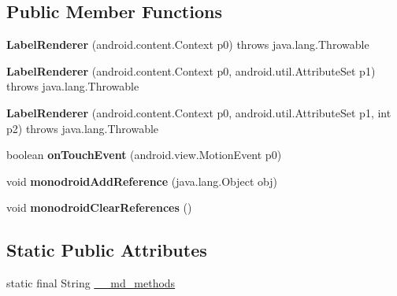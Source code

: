\subsection*{Public Member Functions}
\begin{DoxyCompactItemize}
\item 
\mbox{\label{classmd57018357d52b54713cd814fbd5262dd1f_1_1LabelRenderer_aaebdd1a385896c15116f4f28a7b14918}} 
{\bfseries Label\+Renderer} (android.\+content.\+Context p0)  throws java.\+lang.\+Throwable 	
\item 
\mbox{\label{classmd57018357d52b54713cd814fbd5262dd1f_1_1LabelRenderer_adaa775bc61d4d4d62b052709e7420a74}} 
{\bfseries Label\+Renderer} (android.\+content.\+Context p0, android.\+util.\+Attribute\+Set p1)  throws java.\+lang.\+Throwable 	
\item 
\mbox{\label{classmd57018357d52b54713cd814fbd5262dd1f_1_1LabelRenderer_aca7fb08e1f26103c255dfaa50e9f0a16}} 
{\bfseries Label\+Renderer} (android.\+content.\+Context p0, android.\+util.\+Attribute\+Set p1, int p2)  throws java.\+lang.\+Throwable 	
\item 
\mbox{\label{classmd57018357d52b54713cd814fbd5262dd1f_1_1LabelRenderer_a29e4f37b703ed211f7df60679839d2bf}} 
boolean {\bfseries on\+Touch\+Event} (android.\+view.\+Motion\+Event p0)
\item 
\mbox{\label{classmd57018357d52b54713cd814fbd5262dd1f_1_1LabelRenderer_a565940650659653853e6c97f4efb5f07}} 
void {\bfseries monodroid\+Add\+Reference} (java.\+lang.\+Object obj)
\item 
\mbox{\label{classmd57018357d52b54713cd814fbd5262dd1f_1_1LabelRenderer_ad17a308f68c51092a4967293f970fbaa}} 
void {\bfseries monodroid\+Clear\+References} ()
\end{DoxyCompactItemize}
\subsection*{Static Public Attributes}
\begin{DoxyCompactItemize}
\item 
static final String \hyperlink{classmd57018357d52b54713cd814fbd5262dd1f_1_1LabelRenderer_acbf8d2cb7c72ee5391f580882a66080f}{\+\_\+\+\_\+md\+\_\+methods}
\end{DoxyCompactItemize}
